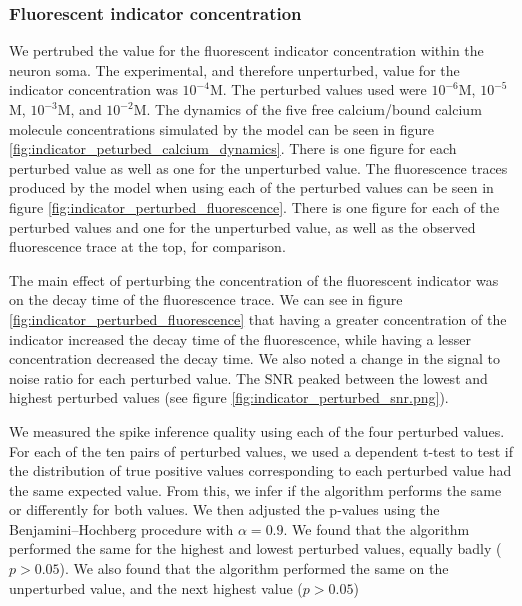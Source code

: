 \documentclass[a4paper,12pt]{article}
\theoremstyle{definition}
\begin{document}
\subsubsection{Fluorescent indicator concentration}

We pertrubed the value for the fluorescent indicator concentration within the neuron soma. The experimental, and therefore unperturbed, value for the indicator concentration was $10^{-4}$M. The perturbed values used were $10^{-6}$M, $10^{-5}$M, $10^{-3}$M, and $10^{-2}$M. The dynamics of the five free calcium/bound calcium molecule concentrations simulated by the model can be seen in figure \ref{fig:indicator_peturbed_calcium_dynamics}. There is one figure for each perturbed value as well as one for the unperturbed value. The fluorescence traces produced by the model when using each of the perturbed values can be seen in figure \ref{fig:indicator_perturbed_fluorescence}. There is one figure for each of the perturbed values and one for the unperturbed value, as well as the observed fluorescence trace at the top, for comparison.

The main effect of perturbing the concentration of the fluorescent indicator was on the decay time of the fluorescence trace. We can see in figure \ref{fig:indicator_perturbed_fluorescence} that having a greater concentration of the indicator increased the decay time of the fluorescence, while having a lesser concentration decreased the decay time. We also noted a change in the signal to noise ratio for each perturbed value. The SNR peaked between the lowest and highest perturbed values (see figure \ref{fig:indicator_perturbed_snr.png}).

We measured the spike inference quality using each of the four perturbed values. For each of the ten pairs of perturbed values, we used a dependent t-test to test if the distribution of true positive values corresponding to each perturbed value had the same expected value. From this, we infer if the algorithm performs the same or differently for both values. We then adjusted the p-values using the Benjamini–Hochberg procedure with $\alpha = 0.9$. We found that the algorithm performed the same for the highest and lowest perturbed values, equally badly ($p > 0.05$). We also found that the algorithm performed the same on the unperturbed value, and the next highest value ($p > 0.05$)
\end{document}
